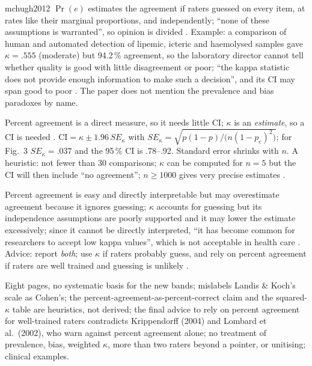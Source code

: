 \begin{papercard}{mchugh2012}
 $\Pr(e)$ estimates the agreement if raters guessed on every item, at rates like their marginal proportions, and independently; ``none of these assumptions is warranted'', so opinion is divided . Example: a comparison of human and automated detection of lipemic, icteric and haemolysed samples gave $\kappa=.555$ (moderate) but 94.2\,\% agreement, so the laboratory director cannot tell whether quality is good with little disagreement or poor; ``the kappa statistic does not provide enough information to make such a decision'', and its CI may span good to poor . The paper does not mention the prevalence and bias paradoxes by name.

 Percent agreement is a direct measure, so it needs little CI; $\kappa$ is an \emph{estimate}, so a CI is needed . $\mathrm{CI}=\kappa\pm1.96\,SE_\kappa$ with $SE_\kappa=\sqrt{p(1-p)/\bigl(n(1-p_e)^2\bigr)}$; for Fig.\ 3 $SE_\kappa=.037$ and the 95\,\% CI is .78--.92. Standard error shrinks with $n$. A heuristic: not fewer than 30 comparisons; $\kappa$ can be computed for $n=5$ but the CI will then include ``no agreement''; $n\ge1000$ gives very precise estimates .

 Percent agreement is easy and directly interpretable but may overestimate agreement because it ignores guessing; $\kappa$ accounts for guessing but its independence assumptions are poorly supported and it may lower the estimate excessively; since it cannot be directly interpreted, ``it has become common for researchers to accept low kappa values'', which is not acceptable in health care . Advice: report \emph{both}; use $\kappa$ if raters probably guess, and rely on percent agreement if raters are well trained and guessing is unlikely .

 Eight pages, no systematic basis for the new bands; mislabels Landis \& Koch's scale as Cohen's; the percent-agreement-as-percent-correct claim and the squared-$\kappa$ table are heuristics, not derived; the final advice to rely on percent agreement for well-trained raters contradicts Krippendorff (2004) and Lombard et al.\ (2002), who warn against percent agreement alone; no treatment of prevalence, bias, weighted $\kappa$, more than two raters beyond a pointer, or unitising; clinical examples.


\end{papercard}
